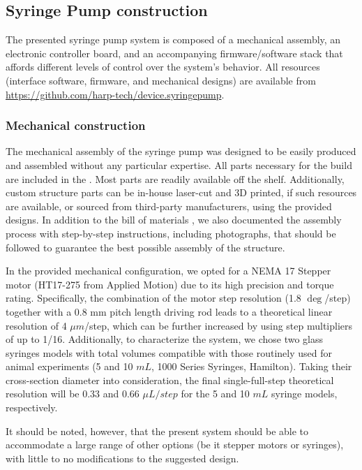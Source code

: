 \subsection*{Syringe Pump construction}
The presented syringe pump system is composed of a mechanical assembly, an electronic controller board, and an accompanying firmware/software stack that affords different levels of control over the system's behavior. 
All resources (interface software, firmware, and mechanical designs) are available from \url{https://github.com/harp-tech/device.syringepump}.

\subsubsection*{Mechanical construction}
The mechanical assembly of the syringe pump was designed to be easily produced and assembled without any particular expertise. All parts necessary for the build are included in the . Most parts are readily available off the shelf. Additionally, custom structure parts can be in-house laser-cut and 3D printed, if such resources are available, or sourced from third-party manufacturers, using the provided designs. In addition to the bill of materials , we also documented the assembly process with step-by-step instructions, including photographs, that should be followed to guarantee the best possible assembly of the structure.

In the provided mechanical configuration, we opted for a NEMA 17 Stepper motor (HT17-275 from Applied Motion) due to its high precision and torque rating. Specifically, the combination of the motor step resolution (1.8 $\deg$/step) together with a 0.8 mm pitch length driving rod leads to a theoretical linear resolution of 4 $\mu m$/step, which can be further increased by using step multipliers of up to 1/16.
Additionally, to characterize the system, we chose two glass syringes models with total volumes compatible with those routinely used for animal experiments (5 and 10 $mL$, 1000 Series Syringes, Hamilton). Taking their cross-section diameter into consideration, the final single-full-step theoretical resolution will be 0.33 and 0.66 $\mu L / step$ for the 5 and 10 $mL$ syringe models, respectively.

It should be noted, however, that the present system should be able to accommodate a large range of other options (be it stepper motors or syringes), with little to no modifications to the suggested design.

